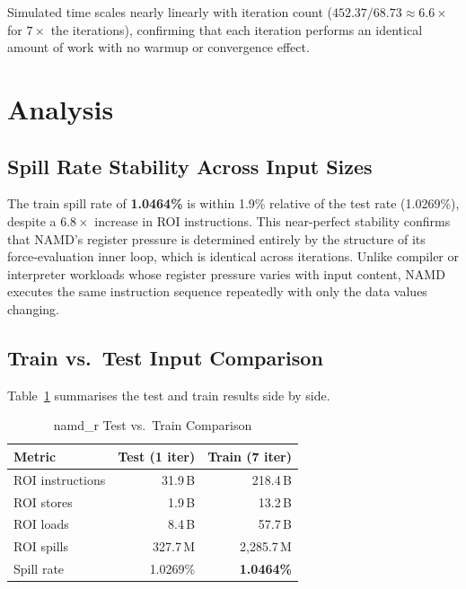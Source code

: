 \documentclass[conference]{IEEEtran}
\begin{document}
Simulated time scales nearly linearly with iteration count
($452.37 / 68.73 \approx 6.6\times$ for $7\times$ the iterations),
confirming that each iteration performs an identical amount of work
with no warmup or convergence effect.

\section{Analysis}

\subsection{Spill Rate Stability Across Input Sizes}

The train spill rate of \textbf{1.0464\%} is within 1.9\% relative
of the test rate (1.0269\%), despite a $6.8\times$ increase in ROI
instructions. This near-perfect stability confirms that NAMD's
register pressure is determined entirely by the structure of its
force-evaluation inner loop, which is identical across iterations.
Unlike compiler or interpreter workloads whose register pressure
varies with input content, NAMD executes the same instruction
sequence repeatedly with only the data values changing.

\subsection{Train vs.\ Test Input Comparison}

Table~\ref{tab:compare_test_train} summarises the test and train
results side by side.

\begin{table}[H]
\centering
\caption{namd\_r Test vs.\ Train Comparison}
\label{tab:compare_test_train}
\begin{tabular}{lrr}
\toprule
\textbf{Metric} & \textbf{Test (1 iter)} & \textbf{Train (7 iter)} \\
\midrule
ROI instructions & 31.9\,B  & 218.4\,B \\
ROI stores       &  1.9\,B  &  13.2\,B \\
ROI loads        &  8.4\,B  &  57.7\,B \\
ROI spills       & 327.7\,M &   2,285.7\,M \\
Spill rate       & 1.0269\% & \textbf{1.0464\%} \\
\bottomrule
\end{tabular}
\end{table}
\end{document}
